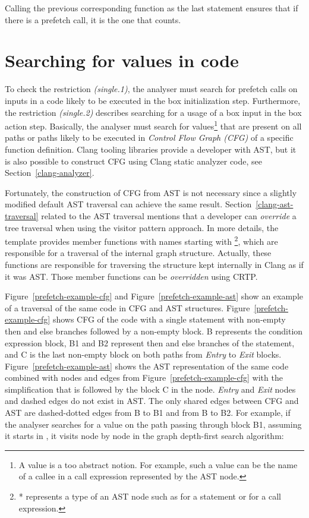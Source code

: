 Calling the previous corresponding  function as the last statement ensures that if there is a prefetch call, it is the one that counts.

\section{Searching for values in code}
To check the restriction \emph{(single.1)}, the analyser must search for prefetch calls on inputs in a code likely to be executed in the box initialization step. Furthermore, the restriction \emph{(single.2)} describes searching for a usage of a box input in the box action step. Basically, the analyser must search for values\footnote{A value is a too abstract notion. For example, such a value can be the name of a callee in a call expression represented by the  AST node.} that are present on all paths or paths likely to be executed in \emph{Control Flow Graph (CFG)} of a specific function definition. Clang tooling libraries provide a developer with AST, but it is also possible to construct CFG using Clang static analyzer code, see Section~\ref{clang-analyzer}.

Fortunately, the construction of CFG from AST is not necessary since a slightly modified default AST traversal can achieve the same result. Section~\ref{clang-ast-traversal} related to the AST traversal mentions that a developer can \textit{override} a tree traversal when using the visitor pattern approach. In more details, the  template provides member functions with names starting with \footnote{* represents a type of an AST node such as  for a statement or  for a call expression.}, which are responsible for a traversal of the internal graph structure. Actually, these functions are responsible for traversing the structure kept internally in Clang as if it was AST. Those member functions can be \textit{overridden} using CRTP.

Figure~\ref{prefetch-example-cfg} and Figure~\ref{prefetch-example-ast} show an example of a traversal of the same code in CFG and AST structures. Figure~\ref{prefetch-example-cfg} shows CFG of the code with a single  statement with non-empty then and else branches followed by a non-empty block. B represents the condition expression block, B1 and B2 represent then and else branches of the  statement, and C is the last non-empty block on both paths from \emph{Entry} to \emph{Exit} blocks. Figure~\ref{prefetch-example-ast} shows the AST representation of the same code combined with nodes and edges from Figure~\ref{prefetch-example-cfg} with the simplification that  is followed by the block C in the  node. \emph{Entry} and \emph{Exit} nodes and dashed edges do not exist in AST. The only shared edges between CFG and AST are dashed-dotted edges from B to B1 and from B to B2. For example, if the analyser searches for a value on the path passing through block B1, assuming it starts in , it visits node by node in the graph depth-first search algorithm:

